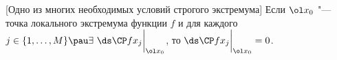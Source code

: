 [Одно из многих необходимых условий строгого экстремума]
	 Если $\ol x_0$ "--- точка локального экстремума функции $f$ и для каждого $j\in\{1,\ldots,M\}\pau \exists\ \ds\CP f{x_j}\bigg|_{\ol x_0}$,
	 то $\ds\CP f{x_j}\bigg|_{\ol x_0}=0$.
	 